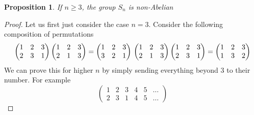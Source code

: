 \documentclass{article}
\newtheorem{proposition}[theorem]{Proposition}
\theoremstyle{definition}
\begin{document}
\begin{proposition}
    If $n\geq 3$, the group $S_n$ is non-Abelian \label{prop:1.12}
\end{proposition}
\begin{proof}
    Let us first just consider the case $n=3$. Consider the following composition of permutations 
    \begin{equation*}
        \begin{pmatrix}
            1&2&3\\2&3&1
        \end{pmatrix}
        \begin{pmatrix}
            1&2&3\\2&1&3
        \end{pmatrix} = \begin{pmatrix}
            1&2&3\\3&2&1
        \end{pmatrix}\\
        \begin{pmatrix}
            1&2&3\\2&1&3
        \end{pmatrix} \begin{pmatrix}
            1&2&3\\2&3&1
        \end{pmatrix}=\begin{pmatrix}
            1&2&3\\1&3&2
        \end{pmatrix}
    \end{equation*}
    We can prove this for higher $n$ by simply sending everything beyond 3 to their number. For example 
    \begin{equation*}
        \begin{pmatrix}
            1&2&3&4&5&\ldots\\2&3&1&4&5&\ldots
        \end{pmatrix}
    \end{equation*}
\end{proof}
\end{document}
